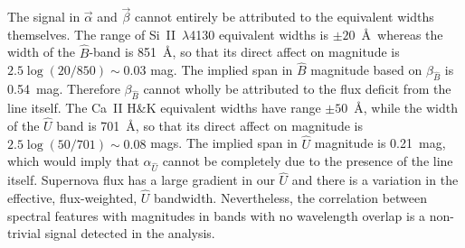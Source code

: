 \documentclass[trackchanges]{aastex61}   	%
\begin{document}
The signal in  $\vec{\alpha}$ and $\vec{\beta}$ cannot
entirely
be attributed to the equivalent widths themselves.
The range of Si~II~$\lambda$4130 equivalent widths is $\pm 20$~\AA\ whereas the width of the ${\hat{B}}$-band is 851~\AA, so that its direct affect on magnitude
is
$2.5 \log{(20/850)} \sim 0.03$ mag.  
The implied span in ${\hat{B}}$ magnitude based on $\beta_{\hat{B}}$ is 0.54~mag.  Therefore $\beta_{\hat{B}}$ cannot wholly be attributed to the flux deficit
from the line itself.
The Ca~II H\&K equivalent widths have range $\pm 50$~\AA, while the width of the ${\hat{U}}$ band is
701~\AA, so that its direct affect on magnitude
is
$2.5 \log{(50/701)} \sim 0.08$ mags.   The implied span in ${\hat{U}}$ magnitude is  0.21~mag, 
which would imply that  $\alpha_{\hat{U}}$ cannot be completely due to the 
presence of the line itself.  
Supernova flux has a large gradient in our $\hat{U}$ and there is a variation in the effective, flux-weighted,  $\hat{U}$ bandwidth. 
Nevertheless, the  correlation between spectral features with magnitudes in bands with no wavelength overlap is a non-trivial
signal detected in the analysis.
\end{document}
